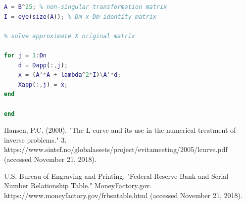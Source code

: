 \documentclass[12pt]{article}
\begin{document}
\begin{flushleft}
\begin{lstlisting}[language=Matlab]
A = B^25; % non-singular transformation matrix
I = eye(size(A)); % Dm x Dm identity matrix

% solve approximate X original matrix

for j = 1:Dn
    d = Dapp(:,j);
    x = (A'*A + lambda^2*I)\A'*d;
    Xapp(:,j) = x;
end

end
\end{lstlisting}

\begin{thebibliography}{1}
Hansen, P.C. (2000). "The L-curve and its use in the numerical treatment of inverse problems." 3. https://www.sintef.no/globalassets/project/evitameeting/2005/lcurve.pdf (accessed November 21, 2018).

U.S. Bureau of Engraving and Printing. "Federal Reserve Bank and Serial Number Relationship Table." MoneyFactory.gov. https://www.moneyfactory.gov/frbsntable.html (accessed November 21, 2018).
\end{thebibliography}

\end{flushleft}
\end{document}
